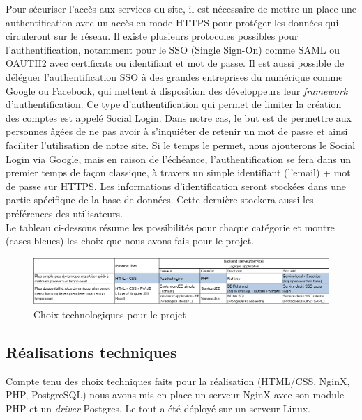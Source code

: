 \documentclass[a4paper,11pt]{article}
\begin{document}
Pour sécuriser l’accès aux services du site, il est nécessaire de mettre un place une authentification
avec un accès en mode HTTPS pour protéger les données qui circuleront sur le réseau. Il existe
plusieurs protocoles possibles pour l’authentification, notamment pour le SSO (Single Sign-On) comme SAML ou
OAUTH2 avec certificats ou identifiant et mot de passe. Il est aussi possible de déléguer l'authentification
SSO à des grandes entreprises du numérique comme Google ou Facebook, qui mettent à disposition des développeurs leur \textit{framework} d'authentification.
Ce type d'authentification qui permet de limiter la création des comptes est appelé Social Login.
Dans notre cas, le but est de permettre aux personnes âgées de ne pas avoir à s’inquiéter de retenir un mot
de passe et ainsi faciliter l’utilisation de notre site. Si le temps le permet, nous ajouterons le Social Login
via Google, mais en raison de l’échéance, l’authentification se fera dans un premier temps de façon classique, à
travers un simple identifiant (l'email) + mot de passe sur HTTPS. Les informations d’identification seront stockées
dans une partie spécifique de la base de données. Cette dernière stockera aussi les préférences des utilisateurs. \\

Le tableau ci-dessous résume les possibilités pour chaque catégorie et montre (cases bleues)
les choix que nous avons fais pour le projet. \\

\begin{figure}[H]
  \includegraphics[width=\linewidth]{images/choixTechno.PNG}
  \caption{Choix technologiques pour le projet}
  \label{fig:choix-techno}
\end{figure}

\subsection{Réalisations techniques}

Compte tenu des choix techniques faits pour la réalisation (HTML/CSS, NginX, PHP, PostgreSQL) nous avons
mis en place un serveur NginX avec son module PHP et un \textit{driver} Postgres. Le tout a été déployé
sur un serveur Linux.\\
\end{document}
